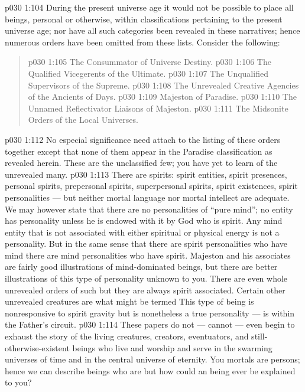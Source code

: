 \vsetspace
\vs p030 1:104 \bibnobreakspace {} During the present universe age it would not be possible to place all beings, personal or otherwise, within classifications pertaining to the present universe age; nor have all such categories been revealed in these narratives; hence numerous orders have been omitted from these lists. Consider the following:
\begin{quote}
\vs p030 1:105 The Consummator of Universe Destiny.
\vs p030 1:106 The Qualified Vicegerents of the Ultimate.
\vs p030 1:107 The Unqualified Supervisors of the Supreme.
\vs p030 1:108 The Unrevealed Creative Agencies of the Ancients of Days.
\vs p030 1:109 Majeston of Paradise.
\vs p030 1:110 The Unnamed Reflectivator Liaisons of Majeston.
\vs p030 1:111 The Midsonite Orders of the Local Universes.
\end{quote}
\vs p030 1:112 \pc No especial significance need attach to the listing of these orders together except that none of them appear in the Paradise classification as revealed herein. These are the unclassified few; you have yet to learn of the unrevealed many.
\vs p030 1:113 There are spirits: spirit entities, spirit presences, personal spirits, prepersonal spirits, superpersonal spirits, spirit existences, spirit personalities --- but neither mortal language nor mortal intellect are adequate. We may however state that there are no personalities of “pure mind”; no entity has personality unless he is endowed with it by God who is spirit. Any mind entity that is not associated with either spiritual or physical energy is not a personality. But in the same sense that there are spirit personalities who have mind there are mind personalities who have spirit. Majeston and his associates are fairly good illustrations of mind\hyp{}dominated beings, but there are better illustrations of this type of personality unknown to you. There are even whole unrevealed orders of such  but they are always spirit associated. Certain other unrevealed creatures are what might be termed  This type of being is nonresponsive to spirit gravity but is nonetheless a true personality --- is within the Father’s circuit.
\vs p030 1:114 \pc These papers do not --- cannot --- even begin to exhaust the story of the living creatures, creators, eventuators, and still\hyp{}otherwise\hyp{}existent beings who live and worship and serve in the swarming universes of time and in the central universe of eternity. You mortals are persons; hence we can describe beings who are  but how could an  being ever be explained to you?
